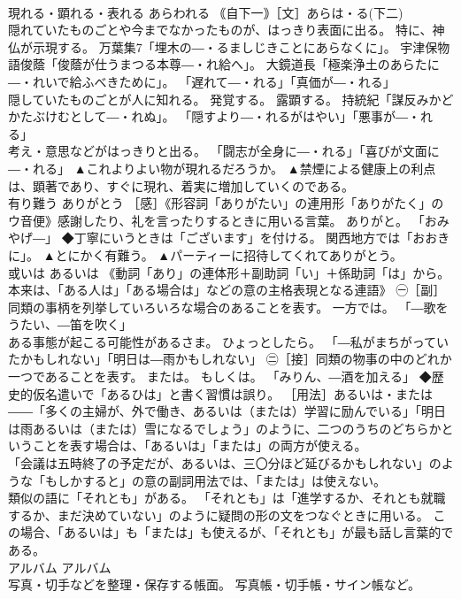 \documentclass[8pt]{extreport}
\begin{document}
\begin{CJK}{UTF8}{min}
\\	現れる・顕れる・表れる	あらわれる	｟自下一｠［文］あらは・る(下二) 
\\	隠れていたものごとや今までなかったものが、はっきり表面に出る。 特に、神仏が示現する。 万葉集7「埋木の―・るましじきことにあらなくに」。 宇津保物語俊蔭「俊蔭が仕うまつる本尊―・れ給へ」。 大鏡道長「極楽浄土のあらたに―・れいで給ふべきために」。 「遅れて―・れる」「真価が―・れる」 
\\	隠していたものごとが人に知れる。 発覚する。 露顕する。 持統紀「謀反みかどかたぶけむとして―・れぬ」。 「隠すより―・れるがはやい」「悪事が―・れる」 
\\	考え・意思などがはっきりと出る。 「闘志が全身に―・れる」「喜びが文面に―・れる」	▲これよりよい物が現れるだろうか。 ▲禁煙による健康上の利点は、顕著であり、すぐに現れ、着実に増加していくのである。
\\	有り難う	ありがとう	［感］《形容詞「ありがたい」の連用形「ありがたく」のウ音便》感謝したり、礼を言ったりするときに用いる言葉。 ありがと。 「おみやげ―」 ◆丁寧にいうときは「ございます」を付ける。 関西地方では「おおきに」。	▲とにかく有難う。 ▲パーティーに招待してくれてありがとう。
\\	或いは	あるいは	《動詞「あり」の連体形＋副助詞「い」＋係助詞「は」から。 本来は、「ある人は」「ある場合は」などの意の主格表現となる連語》 ㊀［副］ 
\\	同類の事柄を列挙していろいろな場合のあることを表す。 一方では。 「―歌をうたい、―笛を吹く」 
\\	ある事態が起こる可能性があるさま。 ひょっとしたら。 「―私がまちがっていたかもしれない」「明日は―雨かもしれない」 ㊁［接］同類の物事の中のどれか一つであることを表す。 または。 もしくは。 「みりん、―酒を加える」 ◆歴史的仮名遣いで「あるひは」と書く習慣は誤り。 ［用法］あるいは・または――「多くの主婦が、外で働き、あるいは（または）学習に励んでいる」「明日は雨あるいは（または）雪になるでしょう」のように、二つのうちのどちらかということを表す場合は、「あるいは」「または」の両方が使える。 
\\	「会議は五時終了の予定だが、あるいは、三〇分ほど延びるかもしれない」のような「もしかすると」の意の副詞用法では、「または」は使えない。 
\\	類似の語に「それとも」がある。 「それとも」は「進学するか、それとも就職するか、まだ決めていない」のように疑問の形の文をつなぐときに用いる。 この場合、「あるいは」も「または」も使えるが、「それとも」が最も話し言葉的である。	
\\	アルバム	アルバム	
\\	写真・切手などを整理・保存する帳面。 写真帳・切手帳・サイン帳など。 

\end{CJK}
\end{document}
